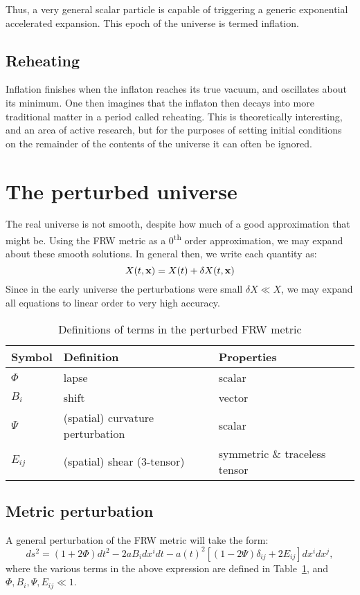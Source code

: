 Thus, a very general scalar particle is capable of triggering a generic exponential accelerated expansion. This epoch of the universe is termed inflation.

\subsection{Reheating}
Inflation finishes when the inflaton reaches its true vacuum, and oscillates about its minimum. One then imagines that the inflaton then decays into more traditional matter in a period called reheating. This is theoretically interesting, and an area of active research, but for the purposes of setting initial conditions on the remainder of the contents of the universe it can often be ignored.




\section{The perturbed universe}
The real universe is not smooth, despite how much of a good approximation that might be. Using the FRW metric as a 0\textsuperscript{th} order approximation, we may expand about these smooth solutions. In general then, we write each quantity as:
\begin{equation}
  X(t,\mathbf{x}) = X(t) + \delta X(t,\mathbf{x})
  \label{eqn:cos:expansion}
\end{equation}
Since in the early universe the perturbations were small $\delta X \ll X$, we may expand all equations to linear order to very high accuracy.

\begin{table}
  \centering
\begin{tabular}{lll}
 \toprule
  Symbol & Definition & Properties \\
 \midrule
 \midrule
 $\Phi$ & lapse & scalar\\
 $B_i$ & shift & vector\\
 $\Psi$ & (spatial) curvature perturbation  & scalar\\
 $E_{ij}$ & (spatial) shear (3-tensor) & symmetric \& traceless tensor\\
 \bottomrule
\end{tabular}
\caption{Definitions of terms in the perturbed FRW metric}\label{tab:cos:perturbed_metric}
\end{table}


\subsection{Metric perturbation}
A general perturbation of the FRW metric will take the form:
\begin{equation}
  ds^2 = (1+2\Phi)dt^2 -2a B_i dx^i dt  -a{(t)}^2 \left[ \left( 1 - 2 \Psi \right)\delta_{ij} + 2E_{ij} \right] dx^i dx^j,
  \label{eqn:cos:FRW_perturb}
\end{equation}
where the various terms in the above expression are defined in Table~\ref{tab:cos:perturbed_metric}, and $\Phi,B_i,\Psi,E_{ij}\ll1$. 

